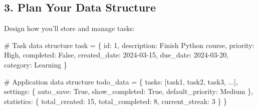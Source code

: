 \documentclass[
  letterpaper,
  DIV=11,
  numbers=noendperiod,
  oneside]{scrreprt}
\newenvironment{Shaded}{}{}
\newcommand{\CommentTok}[1]{\textcolor[rgb]{0.42,0.45,0.49}{#1}}
\newcommand{\DecValTok}[1]{\textcolor[rgb]{0.00,0.36,0.77}{#1}}
\newcommand{\NormalTok}[1]{\textcolor[rgb]{0.14,0.16,0.18}{#1}}
\newcommand{\OperatorTok}[1]{\textcolor[rgb]{0.14,0.16,0.18}{#1}}
\newcommand{\StringTok}[1]{\textcolor[rgb]{0.01,0.18,0.38}{#1}}
\newcommand{\VariableTok}[1]{\textcolor[rgb]{0.89,0.38,0.04}{#1}}
\begin{document}
\subsection{3. Plan Your Data
Structure}\label{plan-your-data-structure-1}

Design how you'll store and manage tasks:

\begin{Shaded}
\begin{Highlighting}[]
\CommentTok{\# Task data structure}
\NormalTok{task }\OperatorTok{=}\NormalTok{ \{}
    \StringTok{\textquotesingle{}id\textquotesingle{}}\NormalTok{: }\DecValTok{1}\NormalTok{,}
    \StringTok{\textquotesingle{}description\textquotesingle{}}\NormalTok{: }\StringTok{\textquotesingle{}Finish Python course\textquotesingle{}}\NormalTok{,}
    \StringTok{\textquotesingle{}priority\textquotesingle{}}\NormalTok{: }\StringTok{\textquotesingle{}High\textquotesingle{}}\NormalTok{,}
    \StringTok{\textquotesingle{}completed\textquotesingle{}}\NormalTok{: }\VariableTok{False}\NormalTok{,}
    \StringTok{\textquotesingle{}created\_date\textquotesingle{}}\NormalTok{: }\StringTok{\textquotesingle{}2024{-}03{-}15\textquotesingle{}}\NormalTok{,}
    \StringTok{\textquotesingle{}due\_date\textquotesingle{}}\NormalTok{: }\StringTok{\textquotesingle{}2024{-}03{-}20\textquotesingle{}}\NormalTok{,}
    \StringTok{\textquotesingle{}category\textquotesingle{}}\NormalTok{: }\StringTok{\textquotesingle{}Learning\textquotesingle{}}
\NormalTok{\}}

\CommentTok{\# Application data structure}
\NormalTok{todo\_data }\OperatorTok{=}\NormalTok{ \{}
    \StringTok{\textquotesingle{}tasks\textquotesingle{}}\NormalTok{: [task1, task2, task3, ...],}
    \StringTok{\textquotesingle{}settings\textquotesingle{}}\NormalTok{: \{}
        \StringTok{\textquotesingle{}auto\_save\textquotesingle{}}\NormalTok{: }\VariableTok{True}\NormalTok{,}
        \StringTok{\textquotesingle{}show\_completed\textquotesingle{}}\NormalTok{: }\VariableTok{True}\NormalTok{,}
        \StringTok{\textquotesingle{}default\_priority\textquotesingle{}}\NormalTok{: }\StringTok{\textquotesingle{}Medium\textquotesingle{}}
\NormalTok{    \},}
    \StringTok{\textquotesingle{}statistics\textquotesingle{}}\NormalTok{: \{}
        \StringTok{\textquotesingle{}total\_created\textquotesingle{}}\NormalTok{: }\DecValTok{15}\NormalTok{,}
        \StringTok{\textquotesingle{}total\_completed\textquotesingle{}}\NormalTok{: }\DecValTok{8}\NormalTok{,}
        \StringTok{\textquotesingle{}current\_streak\textquotesingle{}}\NormalTok{: }\DecValTok{3}
\NormalTok{    \}}
\NormalTok{\}}
\end{Highlighting}
\end{Shaded}
\end{document}
